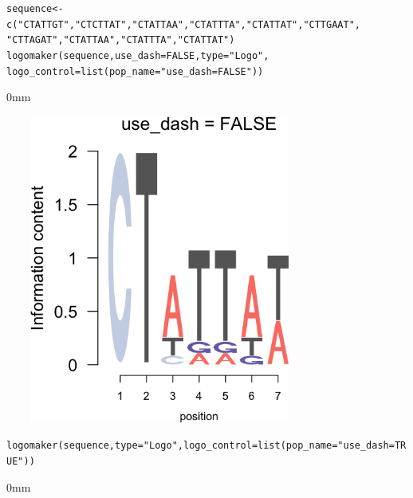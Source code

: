 \documentclass[12pt]{article}\usepackage[]{graphicx}\usepackage[usenames,dvipsnames]{color}
\newcommand{\hlnum}[1]{\textcolor[rgb]{0.816,0.125,0.439}{#1}}%
\newcommand{\hlstr}[1]{\textcolor[rgb]{0.251,0.627,0.251}{#1}}%
\newcommand{\hlstd}[1]{\textcolor[rgb]{0.251,0.251,0.251}{#1}}%
\newcommand{\hlkwb}[1]{\textcolor[rgb]{0,0,0}{#1}}%
\newcommand{\hlkwc}[1]{\textcolor[rgb]{0.251,0.251,0.251}{#1}}%
\newcommand{\hlkwd}[1]{\textcolor[rgb]{0.878,0.439,0.125}{#1}}%
\newenvironment{knitrout}{}{} %
\begin{document}
\begin{knitrout}
\color{fgcolor}\begin{kframe}
\begin{alltt}
\hlstd{sequence} \hlkwb{<-} \hlkwd{c}\hlstd{(}\hlstr{"CTATTGT"}\hlstd{,} \hlstr{"CTCTTAT"}\hlstd{,} \hlstr{"CTATTAA"}\hlstd{,} \hlstr{"CTATTTA"}\hlstd{,} \hlstr{"CTATTAT"}\hlstd{,} \hlstr{"CTTGAAT"}\hlstd{,}
              \hlstr{"CTTAGAT"}\hlstd{,} \hlstr{"CTATTAA"}\hlstd{,} \hlstr{"CTATTTA"}\hlstd{,} \hlstr{"CTATTAT"}\hlstd{)}
\hlkwd{logomaker}\hlstd{(sequence,} \hlkwc{use_dash} \hlstd{=} \hlnum{FALSE}\hlstd{,} \hlkwc{type} \hlstd{=} \hlstr{"Logo"}\hlstd{,}
          \hlkwc{logo_control} \hlstd{=} \hlkwd{list}\hlstd{(}\hlkwc{pop_name} \hlstd{=} \hlstr{"use_dash = FALSE"}\hlstd{))}
\end{alltt}
\end{kframe}\begin{adjustwidth}{\fltoffset}{0mm}

\includegraphics[width=4in,height=4in]{figure/dash-1} \hfill{}

\end{adjustwidth}\begin{kframe}\begin{alltt}
\hlkwd{logomaker}\hlstd{(sequence,} \hlkwc{type} \hlstd{=} \hlstr{"Logo"}\hlstd{,} \hlkwc{logo_control} \hlstd{=} \hlkwd{list}\hlstd{(}\hlkwc{pop_name} \hlstd{=} \hlstr{"use_dash = TRUE"}\hlstd{))}
\end{alltt}
\end{kframe}\begin{adjustwidth}{\fltoffset}{0mm}


\end{adjustwidth}
\end{knitrout}
\end{document}
